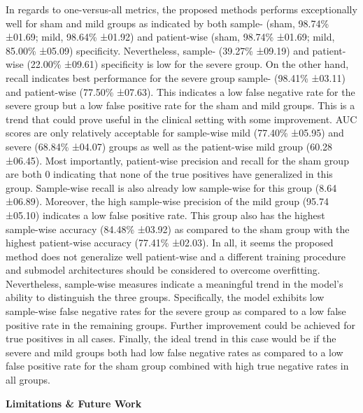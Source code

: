 \documentclass[
]{article}
\begin{document}
In regards to one-versus-all metrics, the proposed methods performs
exceptionally well for sham and mild groups as indicated by both sample-
(sham, 98.74\% ±01.69; mild, 98.64\% ±01.92) and patient-wise (sham,
98.74\% ±01.69; mild, 85.00\% ±05.09) specificity. Nevertheless, sample-
(39.27\% ±09.19) and patient-wise (22.00\% ±09.61) specificity is low
for the severe group. On the other hand, recall indicates best
performance for the severe group sample- (98.41\% ±03.11) and
patient-wise (77.50\% ±07.63). This indicates a low false negative rate
for the severe group but a low false positive rate for the sham and mild
groups. This is a trend that could prove useful in the clinical setting
with some improvement. AUC scores are only relatively acceptable for
sample-wise mild (77.40\% ±05.95) and severe (68.84\% ±04.07) groups as
well as the patient-wise mild group (60.28 ±06.45). Most importantly,
patient-wise precision and recall for the sham group are both 0
indicating that none of the true positives have generalized in this
group. Sample-wise recall is also already low sample-wise for this group
(8.64 ±06.89). Moreover, the high sample-wise precision of the mild
group (95.74 ±05.10) indicates a low false positive rate. This group
also has the highest sample-wise accuracy (84.48\% ±03.92) as compared
to the sham group with the highest patient-wise accuracy (77.41\%
±02.03). In all, it seems the proposed method does not generalize well
patient-wise and a different training procedure and submodel
architectures should be considered to overcome overfitting.
Nevertheless, sample-wise measures indicate a meaningful trend in the
model's ability to distinguish the three groups. Specifically, the model
exhibits low sample-wise false negative rates for the severe group as
compared to a low false positive rate in the remaining groups. Further
improvement could be achieved for true positives in all cases. Finally,
the ideal trend in this case would be if the severe and mild groups both
had low false negative rates as compared to a low false positive rate
for the sham group combined with high true negative rates in all groups.

\textbf{Limitations \& Future Work}
\end{document}
